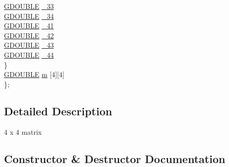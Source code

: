 \begin{DoxyCompactItemize}
\begin{tabbing}
\>\>\hyperlink{_g_types_8h_afd05ac85f90ee8e2a733928545462cd4}{GDOUBLE} \hyperlink{class_c_g_matrix_ae431b467d70b762acb775e95158ace81}{\_33}\\
\>\>\hyperlink{_g_types_8h_afd05ac85f90ee8e2a733928545462cd4}{GDOUBLE} \hyperlink{class_c_g_matrix_a11d67bb18e0103785656a706ba4fd52f}{\_34}\\
\>\>\hyperlink{_g_types_8h_afd05ac85f90ee8e2a733928545462cd4}{GDOUBLE} \hyperlink{class_c_g_matrix_ab1b3ab68107e465aa14c09bbba8ea410}{\_41}\\
\>\>\hyperlink{_g_types_8h_afd05ac85f90ee8e2a733928545462cd4}{GDOUBLE} \hyperlink{class_c_g_matrix_a7f22242f1d45215507afeb12a8ec29e9}{\_42}\\
\>\>\hyperlink{_g_types_8h_afd05ac85f90ee8e2a733928545462cd4}{GDOUBLE} \hyperlink{class_c_g_matrix_a8eafb9e15b09f71966ceb9f7e7afff19}{\_43}\\
\>\>\hyperlink{_g_types_8h_afd05ac85f90ee8e2a733928545462cd4}{GDOUBLE} \hyperlink{class_c_g_matrix_aaa8b7900e9be1da49e52d815f6ea2843}{\_44}\\
\>\} \\
\>\hyperlink{_g_types_8h_afd05ac85f90ee8e2a733928545462cd4}{GDOUBLE} \hyperlink{class_c_g_matrix_a4e8b3bcd13b99f8faccc85af54a4b3b2}{m} \mbox{[}4\mbox{]}\mbox{[}4\mbox{]}\\
\}; \\

\end{tabbing}\end{DoxyCompactItemize}


\subsection{Detailed Description}

\begin{DoxyItemize}
\item 4 x 4 matrix 
\end{DoxyItemize}

\subsection{Constructor \& Destructor Documentation}
\hypertarget{class_c_g_matrix_aea77037ff8e090dd861be15626fa3b28}{}
